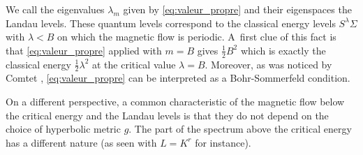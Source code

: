 \documentclass[JEP,XML,SOM,Unicode,published]{cedram}
\theoremstyle{plain}
\theoremstyle{definition}
\let\la\lambda
\let\Si\Sigma
\begin{document}
We call the eigenvalues $\la_m$ given by \eqref{eq:valeur_propre} and their eigenspaces the Landau levels.
These quantum levels correspond to the classical energy
levels $S^\lambda \Si$ with $\lambda <B$ on which the magnetic flow is periodic. A~first
clue of this fact is that \eqref{eq:valeur_propre} applied with $m = B$ gives $\frac{1}{2} B^2$ which is exactly the classical
energy $\frac{1}{2} \lambda^2$ at the critical value $\lambda =B$.
Moreover, as was noticed by Comtet \cite{Comtet-86}, \eqref{eq:valeur_propre} can be interpreted as a
Bohr-Sommerfeld condition.

On a different perspective, a common characteristic
of the magnetic flow below the critical energy and the Landau levels is
that they do not depend on the choice of hyperbolic metric $g$. The part of the spectrum above the
critical energy has a different nature (as seen with $L = K^r$ for instance).
\end{document}
